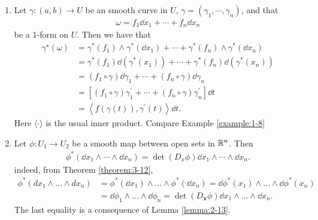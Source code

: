 \begin{example}\;\par\label{example:3-13}
\begin{enumerate}[label=(\roman*)]
  \item Let $\gamma:(a, b)\to U$ be an smooth curve in $U$, $\gamma = (\gamma_1, \cdots, \gamma_n)$, and that 
    \begin{align*}
      \omega = f_1\dd x_1 + \cdots + f_n\dd x_n
    \end{align*}
    be a 1-form on $U$. Then we have that 
    \begin{align*}
      \gamma^{\star}(\omega)
      & = \gamma^{*}(f_{1})\wedge\gamma^{*}(\dd x_{1})+\cdots+\gamma^{*}(f_{n})\wedge\gamma^{*}(\dd x_{n})\\
      & = \gamma^{*}(f_{1})\dd(\gamma^{*}(x_{1}))+\cdots+\gamma^{*}(f_{n})\dd(\gamma^{*}(x_{n}))\\
      & = (f_{1}\circ\gamma)\dd\gamma_{1}+\cdots+(f_{n}\circ\gamma)\dd\gamma_{n}\\
      & = \left[(f_{1}\circ\gamma)\gamma_{1}^{\prime}+\cdots+(f_{n}\circ\gamma)\gamma_{n}^{\prime}\right]\dd t\\
      & = \left\langle f(\gamma(t)),\gamma^{\prime}(t)\right\rangle \dd t.
    \end{align*}
    Here $\langle\cdot\rangle$ is the usual inner product. Compare Example \ref{example:1-8}
  \item Let $\phi:U_1\to U_2$ be a smooth map between open sets in $\mathbb{R}^n$. Then
    \begin{align*}
      \phi^*(\dd x_1\wedge\cdots\wedge\dd x_n) = \det (D_x\phi)\dd x_1\wedge\cdots\wedge\dd x_n.
    \end{align*}
    indeed, from Theorem \ref{theorem:3-12},
    \begin{align*}
      \phi^{*}(dx_{1}\wedge\ldots\wedge dx_{n})
      & = \phi^*(\dd x_1)\wedge\ldots\wedge\phi^*(\dd x_n)
          = \dd\phi^*(x_1)\wedge\ldots\wedge \dd\phi^*(x_n)\\
      & = \dd\phi_1\wedge\ldots\wedge \dd\phi_n
          = \det{(D_{\boldsymbol{x}}\phi)}\dd x_1\wedge\ldots\wedge \dd x_n.
    \end{align*}
    The last equality is a consequence of Lemma \ref{lemma:2-13}.
\end{enumerate}
\end{example}

